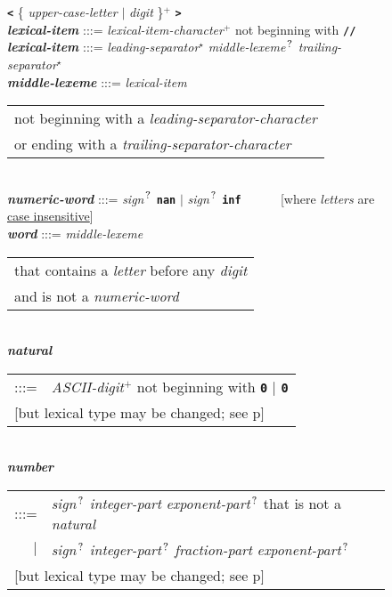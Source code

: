 \documentclass[12pt]{article}
\newcommand{\TT}[1]{{\tt \bfseries #1}}
\newcommand{\STAR}{{\Large $^\star$}}
\newcommand{\PLUS}[1][]{{$^{+#1}$}}
\newcommand{\QMARK}{{$^{\,\mbox{\footnotesize ?}}$}}
\newcommand{\ttkey}[1]{{\tt \bfseries #1}}
\newcommand{\emkey}[1]{{\em \bfseries #1}}
\newcommand{\pagref}[1]{p\pageref{#1}}
\newlength{\figurewidth}
\newenvironment{boxedfigure}[1][!btp]%
	{\begin{figure*}[#1]
	 \begin{lrbox}{\figurebox}
	 \begin{minipage}{\figurewidth}

	 \vspace*{1ex}}%
	{
	 \vspace*{1ex}

	 \end{minipage}
	 \end{lrbox}

	 \centering
	 \fbox{\hspace*{0.1in}\usebox{\figurebox}\hspace*{0.1in}}
	 \end{figure*}}
\begin{document}
\begin{boxedfigure}[!p]
    \TT{<} \{ {\em upper-case-letter} $|$ {\em digit} \}\PLUS{} \TT{>}
\\[1ex]
\emkey{lexical-item} :::= {\em lexical-item-character}\PLUS{}
                       not beginning with \TT{//}
\\[0.5ex]
\emkey{lexical-item} :::= {\em leading-separator}\STAR{}
			  {\em middle-lexeme}\QMARK{}
                          {\em trailing-separator}\STAR{}
\\[0.5ex]
\emkey{middle-lexeme} :::=
	{\em lexical-item}
	\begin{tabular}[t]{@{}l@{}}
	not beginning with a {\em leading-separator-character} \\
	or ending with a {\em trailing-separator-character} \\
	\end{tabular}
\\[0.5ex]
\emkey{numeric-word} :::= {\em sign}\QMARK{} \ttkey{nan}
                      $|$ {\em sign}\QMARK{} \ttkey{inf}
		      ~~~~~
		      [where {\em letters} are \underline{case insensitive}]
\\[0.5ex]
\emkey{word} :::= {\em middle-lexeme}
                  \begin{tabular}[t]{@{}l@{}}
		  that contains a {\em letter} before any {\em digit} \\
		  and is not a {\em numeric-word}
		  \end{tabular}
\\[0.5ex]
\emkey{natural}\label{NATURAL}
	\begin{tabular}[t]{@{}rl@{}}
	:::= & {\em ASCII-digit}\PLUS{} not beginning with \TT{0} $|$
	       \TT{0} \\
	\multicolumn{2}{l}{[but lexical type may be changed;
	                    see \pagref{LEXEME-TYPE-CONVERSION}]} \\
	\end{tabular}
\\[0.5ex]
\emkey{number}\label{NUMBER}
	\begin{tabular}[t]{@{}rl@{}}
	:::= & {\em sign}\QMARK{} {\em integer-part}
	                          {\em exponent-part}\QMARK{}
	     that is not a {\em natural} \\
	 $|$ & {\em sign}\QMARK{} {\em integer-part}\QMARK{}
	                          {\em fraction-part}
				  {\em exponent-part}\QMARK{} \\
	\multicolumn{2}{l}{[but lexical type may be changed;
	                    see \pagref{LEXEME-TYPE-CONVERSION}]} \\
	\end{tabular}

\end{boxedfigure}
\end{document}
